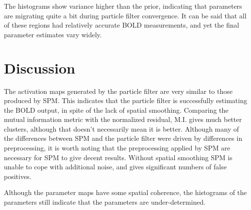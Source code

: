 The histograms show variance higher than the prior, indicating that
parameters are migrating quite a bit during particle filter convergence.
It can be said that all of these regions had relatively accurate BOLD
measurements, and yet the final parameter estimates vary widely.

\section{Discussion}
The activation maps generated by the particle filter are very similar
to those produced by SPM. This indicates that the particle filter is
successfully estimating the BOLD output, in spite of the lack of spatial
smoothing. Comparing the mutual information metric with the normalized residual,
M.I. gives much better clusters, although that doesn't necessarily mean it
is better. Although many of the differences between SPM and the particle filter
were driven by differences in preprocessing, it is worth noting that
the preprocessing applied by SPM are necessary for SPM to give decent results.
Without spatial smoothing SPM is unable to cope with additional noise, and
gives significant numbers of false positives.

Although the parameter maps have some spatial coherence, the histograms
of the parameters still indicate that the parameters are under-determined.
